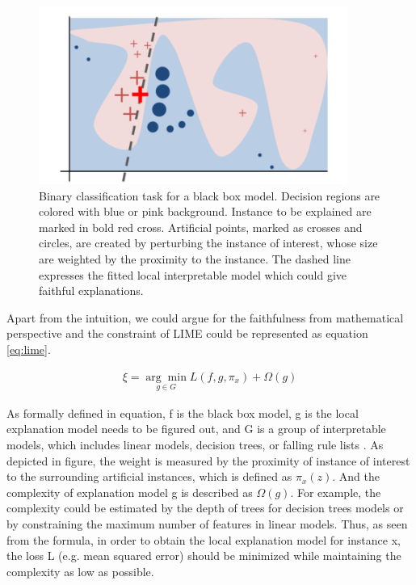 \begin{figure}[H]%
	\includegraphics[width=0.9\textwidth]{imgs/lime.png}
	\caption{Binary classification task for a black box model. Decision regions are colored with blue or pink background. Instance to be explained are marked in bold red cross. Artificial points, marked as crosses and circles, are created by perturbing the instance of interest, whose size are weighted by the proximity to the instance. The dashed line expresses the fitted local interpretable model which could give faithful explanations.}
	\label{fig:lime}
\end{figure}

Apart from the intuition, we could argue for the faithfulness from mathematical perspective and the constraint of LIME could be represented as equation \ref{eq:lime}. 

\begin{equation} \label{eq:lime}
\begin{gathered}
\xi=\underset{g \in {G}}{\arg \min } L\left(f, g, \pi_{x}\right)+\Omega(g)
\end{gathered}
\end{equation}

As formally defined in equation, f is the black box model, g is the local explanation model needs to be figured out, and G is a group of interpretable models, which includes linear models, decision trees, or falling rule lists \cite{wang2015falling}. As depicted in figure, the weight is measured by the proximity of instance of interest to the surrounding artificial instances, which is defined as $\pi_{x}(z)$. And the complexity of explanation model g is described as $\Omega(g)$. For example, the complexity could be estimated by the depth of trees for decision trees models or by constraining the maximum number of features in linear models. Thus, as seen from the formula, in order to obtain the local explanation model for instance x, the loss L (e.g. mean squared error) should be minimized while maintaining the complexity as low as possible.

